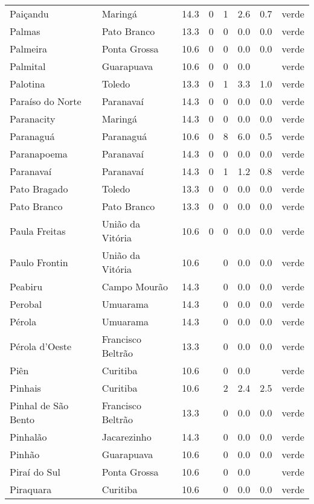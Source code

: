 \begin{longtable}{l|lllllll}
  Paiçandu & Maringá & 14.3 & 0 & 1 & 2.6 & 0.7 & verde \\ 
  Palmas & Pato Branco & 13.3 & 0 & 0 & 0.0 & 0.0 & verde \\ 
  Palmeira & Ponta Grossa & 10.6 & 0 & 0 & 0.0 & 0.0 & verde \\ 
  Palmital & Guarapuava & 10.6 & 0 & 0 & 0.0 &  & verde \\ 
  Palotina & Toledo & 13.3 & 0 & 1 & 3.3 & 1.0 & verde \\ 
  Paraíso do Norte & Paranavaí & 14.3 & 0 & 0 & 0.0 & 0.0 & verde \\ 
  Paranacity & Maringá & 14.3 & 0 & 0 & 0.0 & 0.0 & verde \\ 
  Paranaguá & Paranaguá & 10.6 & 0 & 8 & 6.0 & 0.5 & verde \\ 
  Paranapoema & Paranavaí & 14.3 & 0 & 0 & 0.0 & 0.0 & verde \\ 
  Paranavaí & Paranavaí & 14.3 & 0 & 1 & 1.2 & 0.8 & verde \\ 
  Pato Bragado & Toledo & 13.3 & 0 & 0 & 0.0 & 0.0 & verde \\ 
  Pato Branco & Pato Branco & 13.3 & 0 & 0 & 0.0 & 0.0 & verde \\ 
  Paula Freitas & União da Vitória & 10.6 & 0 & 0 & 0.0 & 0.0 & verde \\ 
  Paulo Frontin & União da Vitória & 10.6 &  & 0 & 0.0 & 0.0 & verde \\ 
  Peabiru & Campo Mourão & 14.3 &  & 0 & 0.0 & 0.0 & verde \\ 
  Perobal & Umuarama & 14.3 &  & 0 & 0.0 & 0.0 & verde \\ 
  Pérola & Umuarama & 14.3 &  & 0 & 0.0 & 0.0 & verde \\ 
  Pérola d'Oeste & Francisco Beltrão & 13.3 &  & 0 & 0.0 & 0.0 & verde \\ 
  Piên & Curitiba & 10.6 &  & 0 & 0.0 &  & verde \\ 
  Pinhais & Curitiba & 10.6 &  & 2 & 2.4 & 2.5 & verde \\ 
  Pinhal de São Bento & Francisco Beltrão & 13.3 &  & 0 & 0.0 & 0.0 & verde \\ 
  Pinhalão & Jacarezinho & 14.3 &  & 0 & 0.0 & 0.0 & verde \\ 
  Pinhão & Guarapuava & 10.6 &  & 0 & 0.0 & 0.0 & verde \\ 
  Piraí do Sul & Ponta Grossa & 10.6 &  & 0 & 0.0 &  & verde \\ 
  Piraquara & Curitiba & 10.6 &  & 0 & 0.0 & 0.0 & verde \\ 

\end{longtable}
